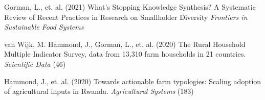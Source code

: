 
Gorman, L., et. al. (2021) What's Stopping Knowledge Synthesis? A Systematic Review of Recent Practices in Research on Smallholder Diversity \textit{Frontiers in Sustainable Food Systems} 

van Wijk, M. Hammond, J., Gorman, L., et. al. (2020) The Rural Household Multiple Indicator Survey, data from 13,310 farm households in 21 countries. \textit{Scientific Data} (46)

Hammond, J., et. al. (2020) Towards actionable farm typologies: Scaling adoption of agricultural inputs in Rwanda. \textit{Agricultural Systems} (183)

